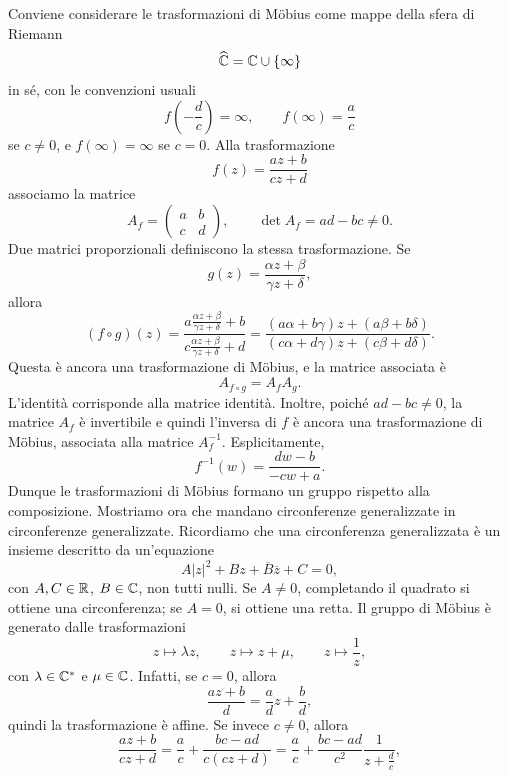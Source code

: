 \documentclass[a4paper]{article}
\begin{document}
\begin{snippetproof}{}
    Conviene considerare le trasformazioni di Möbius come mappe della sfera di Riemann
    \[
        \widehat{\mathbb{C}}=\mathbb{C}\cup\{\infty\}
    \]
    in sé, con le convenzioni usuali
    \[
        f\left(-\frac dc\right)=\infty,
        \qquad
        f(\infty)=\frac ac
    \]
    se \(c\neq0\), e \(f(\infty)=\infty\) se \(c=0\).
    Alla trasformazione
    \[
        f(z)=\frac{az+b}{cz+d}
    \]
    associamo la matrice
    \[
        A_f=
        \begin{pmatrix}
            a & b\\
            c & d
        \end{pmatrix},
        \qquad
        \det A_f=ad-bc\neq0.
    \]
    Due matrici proporzionali definiscono la stessa trasformazione. Se
    \[
        g(z)=\frac{\alpha z+\beta}{\gamma z+\delta},
    \]
    allora
    \[
        (f\circ g)(z)
        =
        \frac{a\frac{\alpha z+\beta}{\gamma z+\delta}+b}{c\frac{\alpha z+\beta}{\gamma z+\delta}+d}
        =
        \frac{(a\alpha+b\gamma)z+(a\beta+b\delta)}{(c\alpha+d\gamma)z+(c\beta+d\delta)}.
    \]
    Questa è ancora una trasformazione di Möbius, e la matrice associata è
    \[
        A_{f\circ g}=A_fA_g.
    \]
    L'identità corrisponde alla matrice identità. Inoltre, poiché \(ad-bc\neq0\), la matrice \(A_f\) è invertibile e quindi l'inversa di \(f\) è ancora una trasformazione di Möbius, associata alla matrice \(A_f^{-1}\). Esplicitamente,
    \[
        f^{-1}(w)=\frac{dw-b}{-cw+a}.
    \]
    Dunque le trasformazioni di Möbius formano un gruppo rispetto alla composizione.
    Mostriamo ora che mandano circonferenze generalizzate in circonferenze generalizzate. Ricordiamo che una circonferenza generalizzata è un insieme descritto da un'equazione
    \[
        A|z|^2+Bz+\overline{B}\overline z+C=0,
    \]
    con \(A,C\in\mathbb{R}\), \(B\in\mathbb{C}\), non tutti nulli. Se \(A\neq0\), completando il quadrato si ottiene una circonferenza; se \(A=0\), si ottiene una retta.
    Il gruppo di Möbius è generato dalle trasformazioni
    \[
        z\mapsto \lambda z,
        \qquad
        z\mapsto z+\mu,
        \qquad
        z\mapsto \frac1z,
    \]
    con \(\lambda\in\mathbb{C}^*\) e \(\mu\in\mathbb{C}\). Infatti, se \(c=0\), allora
    \[
        \frac{az+b}{d}=\frac ad z+\frac bd,
    \]
    quindi la trasformazione è affine. Se invece \(c\neq0\), allora
    \[
        \frac{az+b}{cz+d}
        =
        \frac ac+\frac{bc-ad}{c(cz+d)}
        =
        \frac ac+\frac{bc-ad}{c^2}\frac1{z+\frac dc},
\]
\end{snippetproof}
\end{document}
